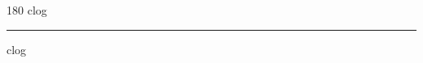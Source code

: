 
\begin{frame}
\begin{center}
\begin{turn}{180}
{\fontsize{2.5cm}{1em}\selectfont clog}
\end{turn}
\vspace{1em}\par  
\hrule
\vspace{1em}\par  
{\fontsize{2.5cm}{1em}\selectfont clog}
\end{center}
\end{frame}
